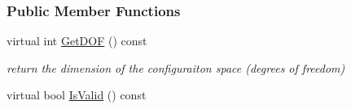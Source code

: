 \subsubsection*{Public Member Functions}
\begin{DoxyCompactItemize}
\item 
\hypertarget{classOpenRAVE_1_1ConfigurationSpecification_a44fbec2fd26a45cada889c5c0f0751c8}{
virtual int \hyperlink{classOpenRAVE_1_1ConfigurationSpecification_a44fbec2fd26a45cada889c5c0f0751c8}{GetDOF} () const }
\label{classOpenRAVE_1_1ConfigurationSpecification_a44fbec2fd26a45cada889c5c0f0751c8}

\begin{DoxyCompactList}\small\item\em return the dimension of the configuraiton space (degrees of freedom) \item\end{DoxyCompactList}\item 
\hypertarget{classOpenRAVE_1_1ConfigurationSpecification_a1d57f75f79e9178bdd17e38a23720d56}{
virtual bool \hyperlink{classOpenRAVE_1_1ConfigurationSpecification_a1d57f75f79e9178bdd17e38a23720d56}{IsValid} () const }
\label{classOpenRAVE_1_1ConfigurationSpecification_a1d57f75f79e9178bdd17e38a23720d56}


\end{DoxyCompactItemize}
